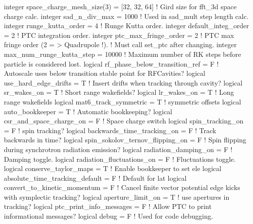 {{{{{{{{\begin{example}
    integer space_charge_mesh_size(3) = [32, 32, 64]  ! Gird size for fft_3d space charge calc.
    integer sad_n_div_max = 1000                ! Used in sad_mult step length calc.
    integer runge_kutta_order = 4               ! Runge Kutta order.
    integer default_integ_order = 2             ! PTC integration order.
    integer ptc_max_fringe_order = 2            ! PTC max fringe order (2  = > Quadrupole !).
                                                !   Must call set_ptc after changing.
    integer max_num_runge_kutta_step = 10000    ! Maximum number of RK steps before particle is considered lost.
    logical rf_phase_below_transition_ref = F   ! Autoscale uses below transition stable point for RFCavities?
    logical use_hard_edge_drifts = T            ! Insert drifts when tracking through cavity?
    logical sr_wakes_on = T                     ! Short range wakefields?
    logical lr_wakes_on = T                     ! Long range wakefields
    logical mat6_track_symmetric = T            ! symmetric offsets
    logical auto_bookkeeper = T                 ! Automatic bookkeeping?
    logical csr_and_space_charge_on = F         ! Space charge switch
    logical spin_tracking_on = F                ! spin tracking?
    logical backwards_time_tracking_on = F      ! Track backwards in time?
    logical spin_sokolov_ternov_flipping_on = F ! Spin flipping during synchrotron radiation emission?
    logical radiation_damping_on = F            ! Damping toggle.
    logical radiation_fluctuations_on = F       ! Fluctuations toggle.
    logical conserve_taylor_maps = T            ! Enable bookkeeper to set ele%
    logical absolute_time_tracking_default = F  ! Default for lat%
    logical convert_to_kinetic_momentum = F     ! Cancel finite vector potential edge kicks with symplectic tracking?
    logical aperture_limit_on = T               ! use apertures in tracking?
    logical ptc_print_info_messages = F         ! Allow PTC to print informational messages?
    logical debug = F                           ! Used for code debugging.





\end{example}}}}}}}}}
